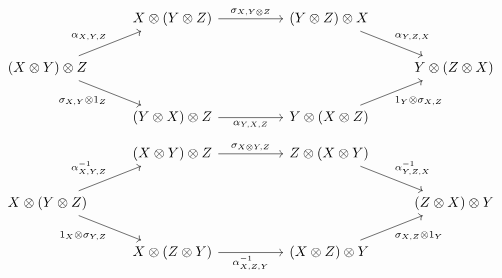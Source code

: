 \begin{center}
        \begin{equation}\label{diagram:braidedhex1}
            \begin{tikzcd}
            &
            X \otimes (Y \otimes Z) 
            \arrow[r, "\sigma_{X, Y\otimes Z}"]
            &[0.8cm]
            (Y \otimes Z) \otimes X
            \arrow[dr, "\alpha_{Y, Z, X}"]
            &
            \\
            (X \otimes Y)\otimes Z
            \arrow[ur, "\alpha_{X, Y, Z}"]
            \arrow[dr, swap, "\sigma_{X, Y} \otimes 1_Z"]
            &
            &
            &
            Y \otimes (Z \otimes X)
            \\
            &
            (Y \otimes X) \otimes Z
            \arrow[r, swap, "\alpha_{Y, X, Z}"]
            &
            Y \otimes (X \otimes Z)
            \arrow[ur, swap, "1_Y \otimes \sigma_{X, Z}"]
            &
        \end{tikzcd}
        \end{equation}
        \begin{equation}\label{diagram:braidedhex2}
            \begin{tikzcd}
            &
            (X\otimes Y) \otimes Z
            \arrow[r, "\sigma_{X\otimes Y, Z}"]
            &[0.8cm]
            Z \otimes (X\otimes Y)
            \arrow[dr, "\alpha^{-1}_{Y, Z, X}"]
            &
            \\
            X\otimes (Y\otimes Z)
            \arrow[ur, "\alpha^{-1}_{X, Y, Z}"]
            \arrow[dr, swap, "1_X \otimes \sigma_{Y,Z}"]
            &
            &
            &
            (Z\otimes X) \otimes Y
            \\
            &
            X\otimes(Z \otimes Y)
            \arrow[r, swap, "\alpha^{-1}_{X, Z, Y}"]
            &
            (X \otimes Z) \otimes Y
            \arrow[ur, swap,  "\sigma_{X, Z} \otimes 1_Y"]
            &
            \end{tikzcd}
        \end{equation} 
    \end{center}
